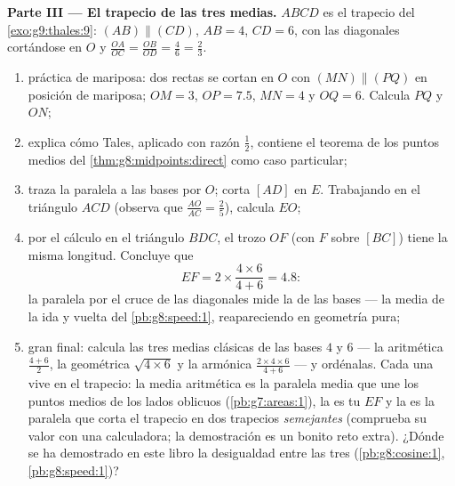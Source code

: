 \begin{problem}
\medskip
\noindent\textbf{Parte III --- El trapecio de las tres
medias.}
$ABCD$ es el trapecio del \cref{exo:g9:thales:9}:
$(AB) \parallel (CD)$, $AB = 4$, $CD = 6$, con las diagonales cortándose en
$O$ y $\frac{OA}{OC} = \frac{OB}{OD} = \frac{4}{6} =
\frac23$.
\begin{enumerate}[resume]
  \item práctica de mariposa: dos rectas se cortan en $O$ con
        $(MN) \parallel (PQ)$ en posición de mariposa; $OM = 3$,
        $OP = 7.5$, $MN = 4$ y $OQ = 6$. Calcula $PQ$ y
        $ON$;
  \item explica cómo Tales, aplicado con razón $\frac12$,
        contiene el teorema de los puntos medios del
        \cref{thm:g8:midpoints:direct} como caso particular;
  \item traza la paralela a las bases por $O$; corta
        $[AD]$ en $E$. Trabajando en el triángulo $ACD$ (observa que
        $\frac{AO}{AC} = \frac25$), calcula $EO$;
  \item por el cálculo  en el triángulo $BDC$, el
        trozo $OF$ (con $F$ sobre $[BC]$) tiene la misma longitud.
        Concluye que
        \[
        EF = 2 \times \frac{4 \times 6}{4 + 6} = 4.8 :
        \]
        la paralela por el cruce de las diagonales mide la
        \emph{} de las bases --- la media
        de la ida y vuelta del \cref{pb:g8:speed:1}, reapareciendo en geometría
        pura;
  \item gran final: calcula las tres medias clásicas de
        las bases $4$ y $6$ --- la aritmética
        $\frac{4+6}{2}$, la geométrica $\sqrt{4 \times 6}$ y la armónica
        $\frac{2 \times 4 \times 6}{4 + 6}$ --- y ordénalas.
        Cada una vive en el trapecio: la media aritmética es la
        paralela media que une los puntos medios de los lados oblicuos
        (\cref{pb:g7:areas:1}), la  es tu
         $EF$ y la  es la paralela
        que corta el trapecio en dos trapecios \emph{semejantes}
        (comprueba su valor con una calculadora; la
        demostración es un bonito reto extra). ¿Dónde se ha demostrado en este libro
        la desigualdad entre las tres
        (\cref{pb:g8:cosine:1}, \cref{pb:g8:speed:1})?
\end{enumerate}
\end{problem}
